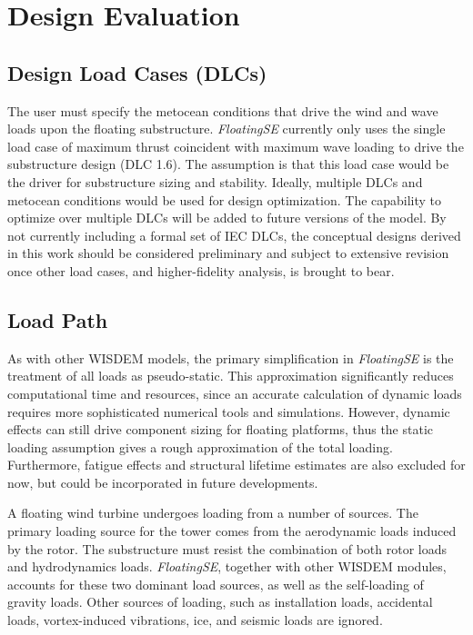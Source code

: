 \chapter{Design Evaluation}
\label{sec:theory}

\section{Design Load Cases (DLCs)}
The user must specify the metocean conditions that drive the wind and
wave loads upon the floating substructure.  \textit{FloatingSE}
currently only uses the single load case of maximum thrust coincident
with maximum wave loading to drive the substructure design (DLC 1.6). The
assumption is that this load case would be the driver for substructure
sizing and stability.  Ideally, multiple DLCs and metocean conditions
would be used for design optimization.  The capability to optimize over
multiple DLCs will be added to future versions of the model.  By not
currently including a formal set of IEC DLCs, the conceptual designs
derived in this work should be considered preliminary and subject to
extensive revision once other load cases, and higher-fidelity analysis,
is brought to bear.

\section{Load Path}
As with other WISDEM models, the primary simplification in
\textit{FloatingSE} is the treatment of all loads as pseudo-static. This
approximation significantly reduces computational time and resources,
since an accurate calculation of dynamic loads requires more
sophisticated numerical tools and simulations.  However, dynamic effects
can still drive component sizing for floating platforms, thus
the static loading assumption gives a rough approximation of the total
loading.  Furthermore, fatigue effects and structural lifetime estimates
are also excluded for now, but could be incorporated in future
developments.

A floating wind turbine undergoes loading from a number of sources.  The
primary loading source for the tower comes from the aerodynamic loads
induced by the rotor. The substructure must resist the combination of
both rotor loads and hydrodynamics loads.  \textit{FloatingSE}, together
with other WISDEM modules, accounts for these two dominant load sources,
as well as the self-loading of gravity loads.  Other sources of loading,
such as installation loads, accidental loads, vortex-induced vibrations,
ice, and seismic loads are ignored.

